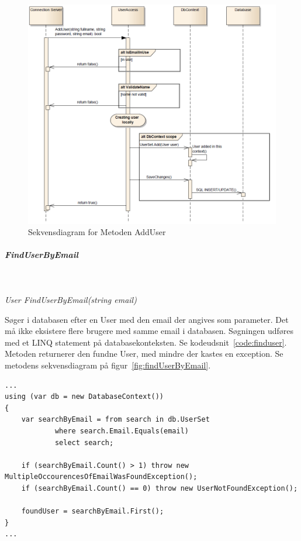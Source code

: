 \begin{figure}[h]
\centering
\includegraphics[width=\linewidth]{figs/dbSeq/adduser.PNG}
\caption{Sekvensdiagram for Metoden AddUser}
\label{fig:adduser}
\end{figure}


\subparagraph{FindUserByEmail}\

\textit{User FindUserByEmail(string email)}

Søger i databasen efter en User med den email der angives som parameter. Det må ikke eksistere flere brugere med samme email i databasen. Søgningen udføres med et LINQ statement på databasekonteksten. Se kodeudsnit~\ref{code:finduser}. Metoden returnerer den fundne User, med mindre der kastes en exception.
Se metodens sekvensdiagram på figur~\ref{fig:findUserByEmail}.

\begin{lstlisting}[caption=Kodeudsnit fra metoden FindUserByEmail, label=code:finduser]
...
using (var db = new DatabaseContext())
{
	var searchByEmail = from search in db.UserSet
			where search.Email.Equals(email)
			select search;

	if (searchByEmail.Count() > 1) throw new    	MultipleOccourencesOfEmailWasFoundException();
	if (searchByEmail.Count() == 0) throw new UserNotFoundException();

	foundUser = searchByEmail.First();
}
...	
\end{lstlisting}


